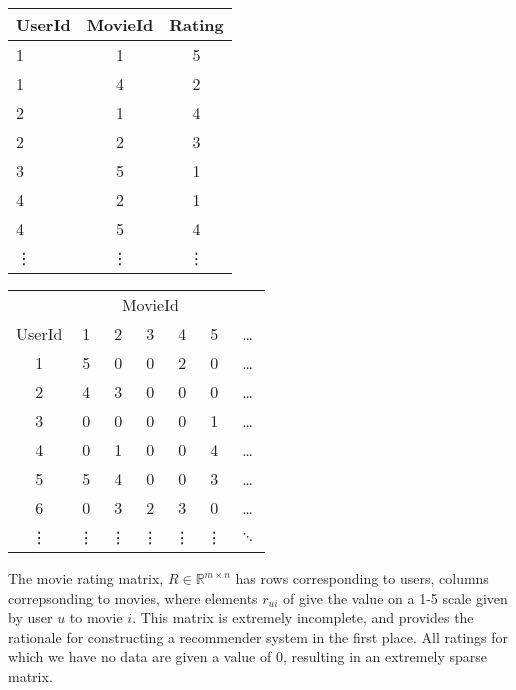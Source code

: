 \documentclass{article} %
\begin{document}

\begin{center}
\begin{tabular}{l c c} 
\toprule 
UserId & MovieId & Rating \\ 
\midrule %
1 & 1 & 5 \\ 
1 & 4 & 2 \\ 
2 & 1 & 4 \\ 
2 & 2 & 3 \\ 
3 & 5 & 1 \\ 
4 & 2 & 1 \\ 
4 & 5 & 4 \\
\vdots  & \vdots & \vdots \\ 
\bottomrule %
\end{tabular}
\quad \quad \quad
\begin{tabular}{c c c c c c c} 
\toprule 
& \multicolumn{5}{c}{MovieId} \\ 
UserId & 1 & 2 & 3 & 4 & 5 & \dots \\ 
\midrule 
1 & 5 & 0 & 0 & 2 & 0 & \dots\\ 
2 & 4 & 3 & 0 & 0 & 0 & \dots\\ 
3 & 0 & 0 & 0 & 0 & 1 & \dots\\ 
4 & 0 & 1 & 0 & 0 & 4 & \dots\\ 
5 & 5 & 4 & 0 & 0 & 3 & \dots\\ 
6 & 0 & 3 & 2 & 3 & 0 & \dots\\ 
\vdots & \vdots & \vdots  & \vdots  & \vdots & \vdots & $\ddots$ \\ 
\bottomrule 
\end{tabular}
\end{center}

The movie rating matrix, $R \in \mathbb{R}^{m \times n}$ has rows corresponding to users, columns correpsonding to movies, where elements $r_{ui}$ of give the value on a 1-5 scale given by user $u$ to movie $i$. This matrix is extremely incomplete, and provides the rationale for constructing a recommender system in the first place. All ratings for which we have no data are given a value of 0, resulting in an extremely sparse matrix. 
\end{document}
